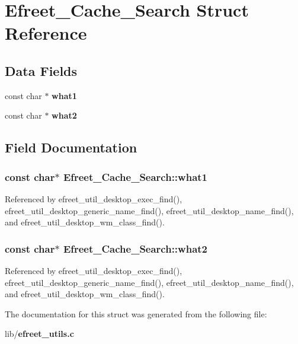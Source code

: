 \section{Efreet\_\-Cache\_\-Search Struct Reference}
\label{structEfreet__Cache__Search}
\subsection*{Data Fields}
\begin{CompactItemize}
\item 
const char $\ast$ {\bf what1}
\item 
const char $\ast$ {\bf what2}
\end{CompactItemize}


\subsection{Field Documentation}
\subsubsection[what1]{\setlength{\rightskip}{0pt plus 5cm}const char$\ast$ {\bf Efreet\_\-Cache\_\-Search::what1}}\label{structEfreet__Cache__Search_276a9eca3a8ab4983b00713c327f3f52}




Referenced by efreet\_\-util\_\-desktop\_\-exec\_\-find(), efreet\_\-util\_\-desktop\_\-generic\_\-name\_\-find(), efreet\_\-util\_\-desktop\_\-name\_\-find(), and efreet\_\-util\_\-desktop\_\-wm\_\-class\_\-find().
\subsubsection[what2]{\setlength{\rightskip}{0pt plus 5cm}const char$\ast$ {\bf Efreet\_\-Cache\_\-Search::what2}}\label{structEfreet__Cache__Search_35dac3d7f03315287bc9429c07258a92}




Referenced by efreet\_\-util\_\-desktop\_\-exec\_\-find(), efreet\_\-util\_\-desktop\_\-generic\_\-name\_\-find(), efreet\_\-util\_\-desktop\_\-name\_\-find(), and efreet\_\-util\_\-desktop\_\-wm\_\-class\_\-find().

The documentation for this struct was generated from the following file:\begin{CompactItemize}
\item 
lib/{\bf efreet\_\-utils.c}\end{CompactItemize}
